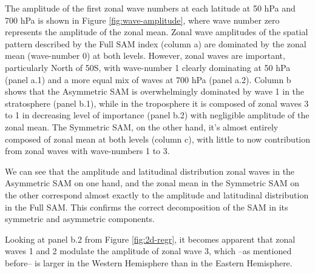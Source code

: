 \documentclass[]{ametsocV5}
\begin{document}
The amplitude of the first zonal wave numbers at each latitude at 50 hPa
and 700 hPa is shown in Figure \ref{fig:wave-amplitude}, where wave
number zero represents the amplitude of the zonal mean. Zonal wave
amplitudes of the spatial pattern described by the Full SAM index
(column a) are dominated by the zonal mean (wave-number 0) at both
levels. However, zonal waves are important, particularly North of
50\degree S, with wave-number 1 clearly dominating at 50 hPa (panel a.1)
and a more equal mix of waves at 700 hPa (panel a.2). Column b shows
that the Asymmetric SAM is overwhelmingly dominated by wave 1 in the
stratosphere (panel b.1), while in the troposphere it is composed of
zonal waves 3 to 1 in decreasing level of importance (panel b.2) with
negligible amplitude of the zonal mean. The Symmetric SAM, on the other
hand, it's almost entirely composed of zonal mean at both levels (column
c), with little to now contribution from zonal waves with wave-numbers 1
to 3.

We can see that the amplitude and latitudinal distribution zonal waves
in the Asymmetric SAM on one hand, and the zonal mean in the Symmetric
SAM on the other correspond almost exactly to the amplitude and
latitudinal distribution in the Full SAM. This confirms the correct
decomposition of the SAM in its symmetric and asymmetric components.

Looking at panel b.2 from Figure \ref{fig:2d-regr}, it becomes apparent
that zonal waves 1 and 2 modulate the amplitude of zonal wave 3, which
--as mentioned before-- is larger in the Western Hemisphere than in the
Eastern Hemisphere.
\end{document}
